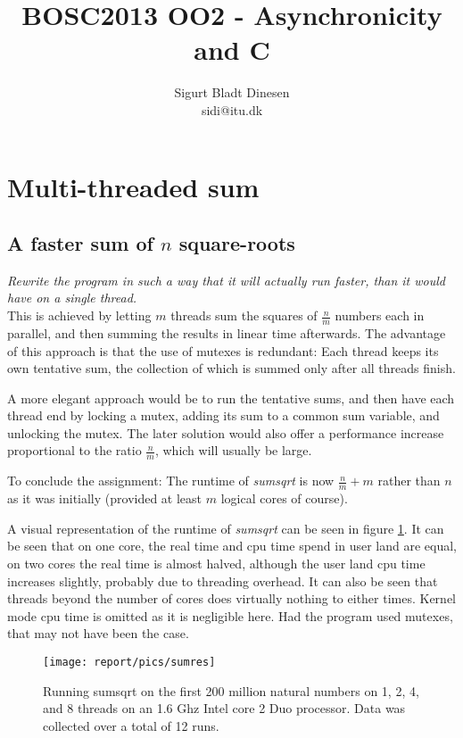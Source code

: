 \documentclass[a4paper, titlepage]{article}
\begin{document}
\title{BOSC2013 OO2 - Asynchronicity and C}
\author{Sigurt Bladt Dinesen \\sidi{@}itu.dk}
\maketitle
\tableofcontents{}
\pagebreak

\section{Multi-threaded sum}
\subsection{A faster sum of $n$ square-roots}
\textit{Rewrite the program in such a way that it will actually run
faster, than it would have on a single thread.}\\

This is achieved by letting $m$ threads sum the squares of $\frac{n}{m}$ numbers
each in parallel, and then summing the results in linear time afterwards. The
advantage of this approach is that the use of mutexes is redundant: Each thread
keeps its own tentative sum, the collection of which is summed only after all
threads finish.

A more elegant approach would be to run the tentative sums, and
then have each thread end by locking a mutex, adding its sum to a common sum
variable, and unlocking the mutex. The later solution would also offer a performance
increase proportional to the ratio $\frac{n}{m}$, which will usually be large.

To conclude the assignment: The runtime of \emph{sumsqrt} is now
$\frac{n}{m}+m$
rather than $n$ as it was initially (provided at least $m$ logical cores of course).

A visual representation of the runtime of \emph{sumsqrt} can be seen in figure
\ref{fig:sumcores}. It can be seen that on one core, the real time and cpu time
spend in user land are equal, on two cores the real time is almost halved,
although the user land cpu time increases slightly, probably due to threading
overhead. It can also be seen that threads beyond the number of cores does
virtually nothing to either times. Kernel mode cpu time is omitted as it is
negligible here. Had the program used mutexes, that may not have been the case.

\begin{figure}[hbpt]
	\texttt{[image: report/pics/sumres]}
	\caption{Running sumsqrt on the first 200 million natural numbers on
	1, 2, 4, and 8 threads on an 1.6 Ghz Intel core 2 Duo processor.
	Data was collected over a total of 12 runs.}
	\label{fig:sumcores}
\end{figure}
\end{document}
